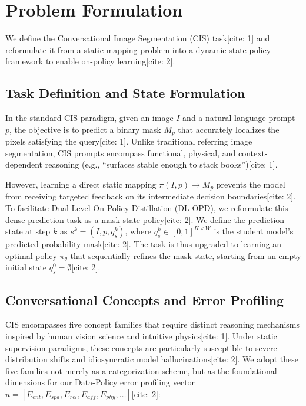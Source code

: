 \section{Problem Formulation}

We define the Conversational Image Segmentation (CIS) task[cite: 1] and reformulate it from a static mapping problem into a dynamic state-policy framework to enable on-policy learning[cite: 2].

\subsection{Task Definition and State Formulation}

In the standard CIS paradigm, given an image $I$ and a natural language prompt $p$, the objective is to predict a binary mask $M_p$ that accurately localizes the pixels satisfying the query[cite: 1]. Unlike traditional referring image segmentation, CIS prompts encompass functional, physical, and context-dependent reasoning (e.g., ``surfaces stable enough to stack books'')[cite: 1].

However, learning a direct static mapping $\pi(I, p) \rightarrow M_p$ prevents the model from receiving targeted feedback on its intermediate decision boundaries[cite: 2]. To facilitate Dual-Level On-Policy Distillation (DL-OPD), we reformulate this dense prediction task as a mask-state policy[cite: 2]. We define the prediction state at step $k$ as $s^k = (I, p, q_s^k)$, where $q_s^k \in [0,1]^{H \times W}$ is the student model's predicted probability mask[cite: 2]. The task is thus upgraded to learning an optimal policy $\pi_\theta$ that sequentially refines the mask state, starting from an empty initial state $q_s^0 = \emptyset$[cite: 2].

\subsection{Conversational Concepts and Error Profiling}

CIS encompasses five concept families that require distinct reasoning mechanisms inspired by human vision science and intuitive physics[cite: 1]. Under static supervision paradigms, these concepts are particularly susceptible to severe distribution shifts and idiosyncratic model hallucinations[cite: 2]. We adopt these five families not merely as a categorization scheme, but as the foundational dimensions for our Data-Policy error profiling vector $u = [E_{ent}, E_{spa}, E_{rel}, E_{aff}, E_{phy}, \dots]$[cite: 2]:

